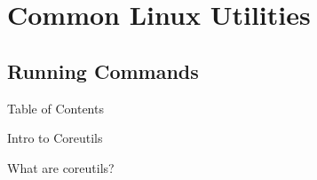 \documentclass{beamer}
\begin{document}
\section{Common Linux Utilities}
\subsection{Running Commands}
\begin{frame}{Table of Contents}
	\tableofcontents[currentsection]
\end{frame}

\begin{frame}{Intro to Coreutils}
	\begin{center}
		\Huge What are coreutils?
	\end{center}
\end{frame}
\end{document}
